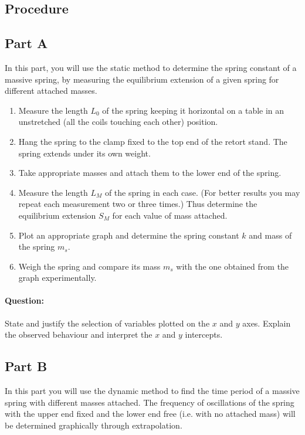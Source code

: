 \begin{refsection}
\section*{Procedure}

\subsection*{Part A}

In this part, you will use the static method to determine the spring constant of a massive spring, by measuring the equilibrium extension of a given spring for different attached masses.

\begin{enumerate}
\item Measure the length $L_0$ of the spring keeping it horizontal on a table in an unstretched (all the coils touching each other) position.
\item Hang the spring to the clamp fixed to the top end of the retort stand. The spring extends under its own weight.
\item Take appropriate masses and attach them to the lower end of the spring. 
\item Measure the length $L_M$ of the spring in each case. (For better results you may repeat
each measurement two or three times.) Thus determine the equilibrium extension $S_M$ for each value of mass attached.
\item Plot an appropriate graph and determine the spring constant $k$ and mass of the spring $m_s$.
\item Weigh the spring and compare its mass $m_s$ with the one obtained from the graph experimentally.
\end{enumerate}

\begin{question}
\paragraph{Question:} State and justify the selection of variables plotted on the $x$ and $y$ axes. Explain the observed behaviour and interpret the $x$ and $y$ intercepts.
\end{question}


\subsection*{Part B}

In this part you will use the dynamic method to find the time period of a massive spring with different masses attached. The frequency of oscillations of the spring with the upper end fixed and the lower end free (i.e. with no attached mass) will be determined graphically through extrapolation.


\end{refsection}
